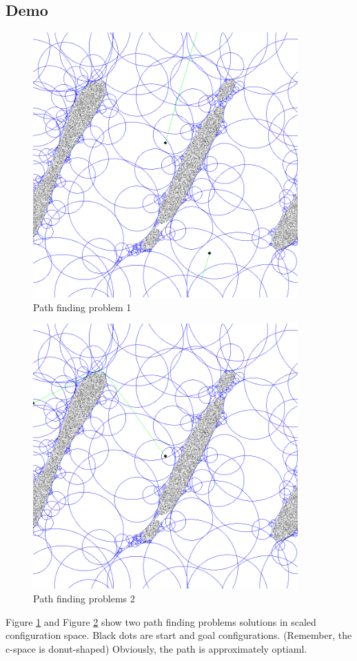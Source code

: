 \documentclass{article}
\begin{document}
  \subsection{Demo}
    \begin{figure}
      \centering
      \includegraphics[width=4in]{Path1.PNG}
      \caption{Path finding problem 1}
      \label{fig:path1}
    \end{figure}
    \begin{figure}
      \centering
      \includegraphics[width=4in]{Path2.PNG}
      \caption{Path finding problems 2}
      \label{fig:path2}
    \end{figure}

    Figure \ref{fig:path1} and Figure \ref{fig:path2} show two path finding problems solutions in scaled configuration space. Black dots are start and goal configurations. (Remember, the c-space is donut-shaped) Obviously, the path is approximately optiaml.
\end{document}
